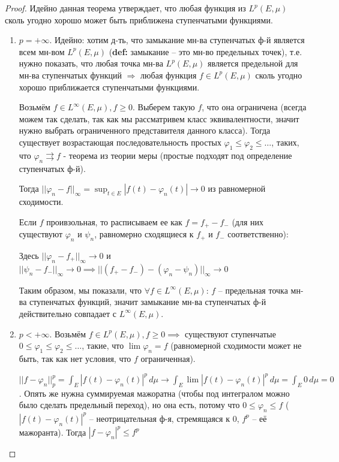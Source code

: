\begin{proof}

    Идейно данная теорема утверждает, что любая функция из $L^p (E, \mu)$ сколь угодно хорошо может быть приближена ступенчатыми функциями.

    \begin{enumerate}
        \item {
            $p = +\infty$. Идейно: хотим д-ть, что замыкание мн-ва ступенчатых ф-й является всем мн-вом $L^p (E, \mu)$ (\textbf{def:} замыкание -- это мн-во предельных точек), т.е. нужно показать, что любая точка мн-ва $L^p (E, \mu)$ является предельной для мн-ва ступенчатых функций $\Rightarrow$ любая функция $f \in L^p (E, \mu)$ сколь угодно хорошо приближается ступенчатыми функциями.


            Возьмём $f \in L^\infty (E, \mu), f \geqslant 0$. Выберем такую $f$, что она ограничена (всегда можем так сделать, так как мы рассматривем класс эквивалентности, значит нужно выбрать ограниченного представителя данного класса).
            Тогда существует возрастающая последовательность простых $\varphi_1 \leqslant \varphi_2 \leqslant \ldots$, таких, что $\varphi_n \rightrightarrows f$ - теорема из теории меры (простые подходят под определение ступенчатых ф-й).

            Тогда $||\varphi_n - f||_{\infty} = \sup_{t \in E} |f(t) - \varphi_n(t)| \rightarrow 0$ из равномерной сходимости.

            Если $f$ проивзольная, то расписываем ее как $f = f_{+} - f_{-}$ (для них существуют $\varphi_n$ и $\psi_n$, равномерно сходящиеся к $f_{+}$ и $f_{-}$ соответственно):

            Здесь $||\varphi_n - f_{+}||_\infty \rightarrow 0$ и $||\psi_n - f_{-}||_\infty \rightarrow 0 \implies ||(f_{+} - f_{-}) - (\varphi_n - \psi_n)||_\infty \rightarrow 0$

            Таким образом, мы показали, что $\forall f \in L^{\infty} (E, \mu)$: $f$ -- предельная точка мн-ва ступенчатых функций, значит замыкание мн-ва ступенчатых ф-й действительно совпадает с $L^{\infty} (E, \mu)$.
        }
        \item {
            $p < +\infty$. Возьмём $f \in L^p (E, \mu), f \geqslant 0 \implies $ существуют ступенчатые $0 \leqslant \varphi_1 \leqslant \varphi_2 \leqslant \ldots$, такие, что $\lim \varphi_n = f$ (равномерной сходимости может не быть, так как нет условия, что $f$ ограниченная).

            $||f - \varphi_n||_p^p = \int_E |f(t) - \varphi_n(t)|^p \, d\mu \rightarrow \int_E \lim |f(t) - \varphi_n(t) |^p \, d\mu = \int_{E} 0\, d\mu = 0$.
            Опять же нужна суммируемая мажоратна (чтобы под интегралом можно было сделать предельный переход), но она есть, потому что $0 \leqslant \varphi_n \leqslant f$ ($|f(t) - \varphi_n(t)|^p$ -- неотрицательная ф-я, стремящаяся к $0$, $f^p$ -- её мажоранта). Тогда $|f - \varphi_n|^p \leqslant f^p$

}
\end{enumerate}
\end{proof}

